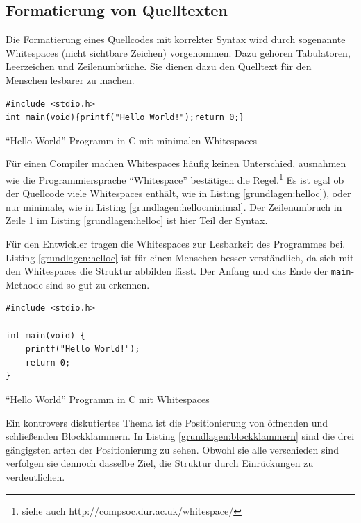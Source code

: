 \subsection{Formatierung von Quelltexten}


Die Formatierung eines Quellcodes mit korrekter Syntax wird durch
sogenannte Whitespaces (nicht sichtbare Zeichen) vorgenommen.
Dazu gehören Tabulatoren, Leerzeichen und Zeilenumbrüche. Sie dienen dazu den Quelltext für den Menschen lesbarer zu machen.

\begin{listing}[H]
    \begin{verbatim}
#include <stdio.h>
int main(void){printf("Hello World!");return 0;}
    \end{verbatim}
    \caption{\enquote{Hello World} Programm in C mit minimalen Whitespaces}
    \label{grundlagen:hellocminimal}
\end{listing}

Für einen Compiler machen Whitespaces häufig keinen Unterschied, ausnahmen wie die Programmiersprache \enquote{Whitespace} bestätigen die Regel.\footnote{siehe auch http://compsoc.dur.ac.uk/whitespace/}
Es ist egal ob der Quellcode viele Whitespaces enthält, wie in Listing \ref{grundlagen:helloc}), oder nur minimale, wie in Listing \ref{grundlagen:hellocminimal}.
Der Zeilenumbruch in Zeile 1 im Listing \ref{grundlagen:helloc} ist hier Teil der Syntax.

Für den Entwickler tragen die Whitespaces zur Lesbarkeit des Programmes bei. Listing \ref{grundlagen:helloc} ist für einen Menschen besser verständlich, da sich mit den Whitespaces die Struktur abbilden lässt. Der Anfang und das Ende der \texttt{main}-Methode sind so gut zu erkennen.

\begin{listing}[H]
    \begin{verbatim}
#include <stdio.h>

int main(void) {
    printf("Hello World!");
    return 0;
}
    \end{verbatim}
    \caption{\enquote{Hello World} Programm in C mit Whitespaces}
    \label{grundlagen:helloc}
\end{listing}

Ein kontrovers diskutiertes Thema ist die Positionierung von öffnenden
und schließenden Blockklammern.
In Listing \ref{grundlagen:blockklammern} sind die drei gängigsten
arten der Positionierung zu sehen. Obwohl sie alle verschieden sind verfolgen
sie dennoch dasselbe Ziel, die Struktur durch Einrückungen zu verdeutlichen.

